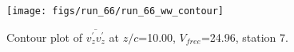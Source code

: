 \begin{figure}[H]
\centering
\texttt{[image: figs/run\_66/run\_66\_ww\_contour]}
\caption{Contour plot of $\overline{v_{z}^{\prime} v_{z}^{\prime}}$ at $z/c$=10.00, $V_{free}$=24.96, station 7.}
\label{fig:run_66_ww_contour}
\end{figure}



